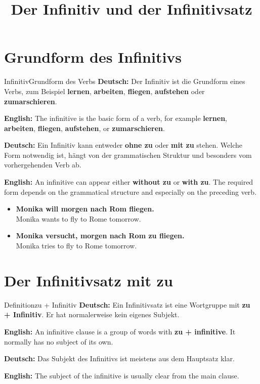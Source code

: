 \documentclass[a4paper,11pt]{article}
\title{Der Infinitiv und der Infinitivsatz}
\date{}
\newcommand{\GermanText}[1]{\textbf{Deutsch: }#1\par}
\newcommand{\EnglishText}[1]{{\small\color{SoftGray}\textbf{English: }#1\par}}
\newcommand{\ExampleItem}[2]{\item \textbf{#1}\\{\small\color{SoftGray}#2}}
\begin{document}
    \maketitle
    \tableofcontents
    \newpage


    \section{Grundform des Infinitivs}

        \begin{grammarentry}{Infinitiv}{Grundform des Verbs}
            \GermanText{Der Infinitiv ist die Grundform eines Verbs, zum Beispiel \textbf{lernen}, \textbf{arbeiten}, \textbf{fliegen}, \textbf{aufstehen} oder \textbf{zumarschieren}.}
            \EnglishText{The infinitive is the basic form of a verb, for example \textbf{lernen}, \textbf{arbeiten}, \textbf{fliegen}, \textbf{aufstehen}, or \textbf{zumarschieren}.}

            \GermanText{Ein Infinitiv kann entweder \textbf{ohne zu} oder \textbf{mit zu} stehen. Welche Form notwendig ist, hängt von der grammatischen Struktur und besonders vom vorhergehenden Verb ab.}
            \EnglishText{An infinitive can appear either \textbf{without zu} or \textbf{with zu}. The required form depends on the grammatical structure and especially on the preceding verb.}
        \end{grammarentry}

        \begin{exbox}
            \begin{itemize}
                \ExampleItem{Monika will morgen nach Rom fliegen.}{Monika wants to fly to Rome tomorrow.}
                \ExampleItem{Monika versucht, morgen nach Rom zu fliegen.}{Monika tries to fly to Rome tomorrow.}
            \end{itemize}
        \end{exbox}


    \section{Der Infinitivsatz mit \glqq zu\grqq}

        \begin{grammarentry}{Definition}{zu + Infinitiv}
            \GermanText{Ein Infinitivsatz ist eine Wortgruppe mit \textbf{zu + Infinitiv}. Er hat normalerweise kein eigenes Subjekt.}
            \EnglishText{An infinitive clause is a group of words with \textbf{zu + infinitive}. It normally has no subject of its own.}

            \GermanText{Das Subjekt des Infinitivs ist meistens aus dem Hauptsatz klar.}
            \EnglishText{The subject of the infinitive is usually clear from the main clause.}
        \end{grammarentry}
\end{document}
